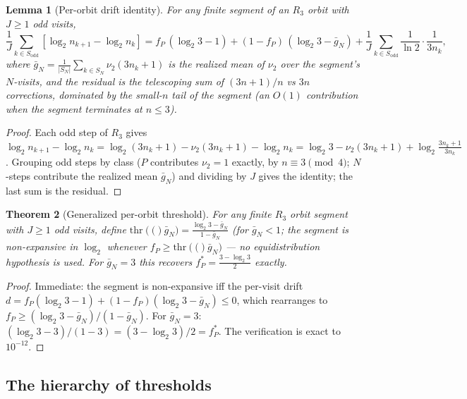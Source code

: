 \documentclass[12pt,reqno]{amsart}
\theoremstyle{plain}
\newtheorem{theorem}{Theorem}[section]
\newtheorem{lemma}[theorem]{Lemma}
\theoremstyle{definition}
\newcommand{\nuTwo}{\nu_2}
\newcommand{\thr}[1]{\mathrm{thr}\!\left(#1\right)}
\begin{document}
\begin{lemma}[Per-orbit drift identity]\label{lem:telescoping}
For any finite segment of an $R_3$ orbit with $J \geq 1$ odd visits,
\begin{equation}\label{eq:telescoping}
\frac{1}{J}\sum_{k \in S_{\mathrm{odd}}} \left[\log_2 n_{k+1} - \log_2 n_k\right]
= f_P\,(\log_2 3 - 1) + (1-f_P)\,(\log_2 3 - \bar g_N)
+ \frac{1}{J}\sum_{k \in S_{\mathrm{odd}}} \frac{1}{\ln 2}\cdot\frac{1}{3n_k},
\end{equation}
where $\bar g_N = \frac{1}{|S_N|}\sum_{k \in S_N} \nuTwo(3n_k+1)$ is the
\emph{realized} mean of $\nuTwo$ over the segment's $N$-visits, and the residual
is the telescoping sum of $(3n+1)/n$ vs $3n$ corrections, dominated by the
small-$n$ tail of the segment (an $O(1)$ contribution when the segment
terminates at $n \le 3$).
\end{lemma}

\begin{proof}
Each odd step of $R_3$ gives $\log_2 n_{k+1} - \log_2 n_k
= \log_2(3n_k+1) - \nuTwo(3n_k+1) - \log_2 n_k
= \log_2 3 - \nuTwo(3n_k+1) + \log_2\!\frac{3n_k+1}{3n_k}$.
Grouping odd steps by class ($P$ contributes $\nuTwo=1$ exactly, by
$n \equiv 3 \pmod 4$; $N$-steps contribute the realized mean $\bar g_N$) and
dividing by $J$ gives the identity; the last sum is the residual.
\end{proof}

\begin{theorem}[Generalized per-orbit threshold]\label{thm:generalized}
For any finite $R_3$ orbit segment with $J \geq 1$ odd visits, define
$\thr(\bar g_N) = \frac{\log_2 3 - \bar g_N}{1 - \bar g_N}$ (for $\bar g_N < 1$;
the segment is non-expansive in $\log_2$ whenever $f_P \geq \thr(\bar g_N)$ --- no equidistribution hypothesis is used.
For $\bar g_N = 3$ this recovers $f_P^* = \frac{3 - \log_2 3}{2}$
\emph{exactly}.
\end{theorem}

\begin{proof}
Immediate: the segment is non-expansive iff the per-visit drift
$d = f_P(\log_2 3 - 1) + (1-f_P)(\log_2 3 - \bar g_N) \le 0$, which rearranges
to $f_P \geq (\log_2 3 - \bar g_N)/(1 - \bar g_N)$. For $\bar g_N = 3$:
$(\log_2 3 - 3)/(1-3) = (3 - \log_2 3)/2 = f_P^*$. The verification is exact to
$10^{-12}$.
\end{proof}

\subsection{The hierarchy of thresholds}\label{sec:hierarchy}
\end{document}
